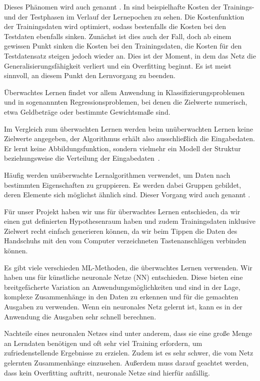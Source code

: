 Dieses Phänomen wird auch  genannt \citep{overfitting}. In  sind beispielhafte Kosten der Trainings- und der Testphasen im Verlauf der Lernepochen zu sehen. Die Kostenfunktion der Trainingsdaten wird optimiert, sodass bestenfalls die Kosten bei den Testdaten ebenfalls sinken. Zunächst ist dies auch der Fall, doch ab einem gewissen Punkt sinken die Kosten bei den Trainingsdaten, die Kosten für den Testdatensatz steigen jedoch wieder an. Dies ist der Moment, in dem das Netz die Generalisierungsfähigkeit verliert und ein Overfitting beginnt. Es ist meist sinnvoll, an diesem Punkt den Lernvorgang zu beenden.

Überwachtes Lernen findet vor allem Anwendung in Klassifizierungsproblemen und in sogenannnten Regressionsproblemen, bei denen die Zielwerte numerisch, etwa Geldbeträge oder bestimmte Gewichtsmaße sind.

Im Vergleich zum überwachten Lernen werden beim unüberwachten Lernen keine Zielwerte angegeben, der Algorithmus erhält also ausschließlich die Eingabedaten. Er lernt keine Abbildungsfunktion, sondern vielmehr ein Modell der Struktur beziehungsweise die Verteilung der Eingabedaten~\cite{web:supunsup}.

Häufig werden unüberwachte Lernalgorithmen verwendet, um Daten nach bestimmten Eigenschaften zu gruppieren. Es werden dabei Gruppen gebildet, deren Elemente sich möglichst ähnlich sind. Dieser Vorgang wird auch  genannt \citep[]{poole-artificial-intelligence} .

Für unser Projekt haben wir uns für überwachtes Lernen entschieden, da wir einen gut definierten Hypothesenraum haben und zudem Trainingsdaten inklusive Zielwert recht einfach generieren können, da wir beim Tippen die Daten des Handschuhs mit den vom Computer verzeichneten Tastenanschlägen verbinden können.

Es gibt viele verschieden ML-Methoden, die überwachtes Lernen verwenden. Wir haben uns für künstliche neuronale Netze (NN) entschieden. Diese bieten eine breitgefächerte Variation an Anwendungsmöglichkeiten und sind in der Lage, komplexe Zusammenhänge in den Daten zu erkennen und für die gemachten Ausgaben zu verwenden. Wenn ein neuronales Netz gelernt ist, kann es in der Anwendung die Ausgaben sehr schnell berechnen.

Nachteile eines neuronalen Netzes sind unter anderem, dass sie eine große Menge an Lerndaten benötigen und oft sehr viel Training erfordern, um zufriedenstellende Ergebnisse zu erzielen. Zudem ist es sehr schwer, die vom Netz gelernten Zusammenhänge einzusehen. Außerdem muss darauf geachtet werden, dass kein Overfitting auftritt, neuronale Netze sind hierfür anfällig.

